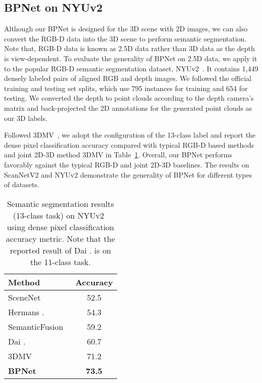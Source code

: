 \documentclass[final]{cvpr}
\begin{document}
\subsection{BPNet on NYUv2}
\vspace{-1.5mm}
Although our BPNet is designed for the 3D scene with 2D images, we can also convert the RGB-D data into the 3D scene to perform semantic segmentation.
Note that, RGB-D data is known as 2.5D data rather than 3D data as the depth is view-dependent.
To evaluate the generality of BPNet on 2.5D data, we apply it to the popular RGB-D semantic segmentation dataset, NYUv2~\cite{Silberman:ECCV12}.
It contains 1,449 densely labeled pairs of aligned RGB and depth images.
We followed the official training and testing set splits, which use 795 instances for training and 654 for testing.
We converted the depth to point clouds according to the depth camera's matrix and back-projected the 2D annotations for the generated point clouds as our 3D labels.


Followed 3DMV~\cite{dai20183dmv}, we adopt the configuration of the 13-class label and report the dense pixel classification accuracy compared with typical RGB-D based methods and joint 2D-3D method 3DMV in Table~\ref{tab:nyu}.
Overall, our BPNet performs favorably against the typical RGB-D and joint 2D-3D baselines.
The results on ScanNetV2 and NYUv2 demonstrate the generality of BPNet for different types of datasets.







\begin{table}[!t]
\centering
	\renewcommand{\tabcolsep}{12pt}
\begin{tabular}{l|c}
		\toprule[1pt] 
		Method                             &    Accuracy      \\ \hline
		SceneNet~\cite{handa2015scenenet} & 52.5 \\
		Hermans \etal.~\cite{hermans2014dense} & 54.3 \\
		SemanticFusion~\cite{mccormac2017semanticfusion} & 59.2 \\
		Dai \etal.~\cite{dai2017scannet} & 60.7 \\
		3DMV~\cite{dai20183dmv} & 71.2 \\
		\textbf{BPNet}                     & \textbf{73.5}  \\    \bottomrule[1pt]
	\end{tabular}
\vspace{1mm}
	\caption{Semantic segmentation results (13-class task) on NYUv2~\cite{Silberman:ECCV12} using dense pixel classification accuracy metric. Note that the reported result of Dai \etal. is on the 11-class task.}
	\vspace{-4.5mm}
	\label{tab:nyu}
\end{table}
\end{document}
